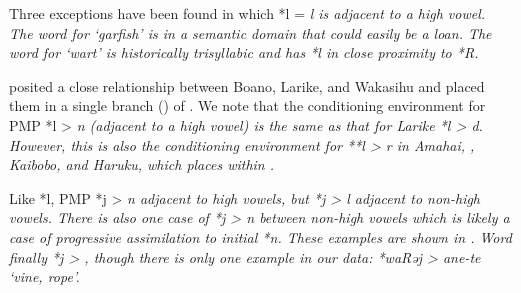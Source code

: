 Three exceptions have been found in which *l = \it{l} is adjacent
to a high vowel.
The word for ‘garfish’ is in a semantic domain that could easily be a loan.
The word for ‘wart’ is historically trisyllabic
and has *l in close proximity to *R.


\citet[69]{Collins1983} posited a close relationship between
Boano, Larike, and Wakasihu and placed them in a single branch () of .
We note that the conditioning environment for PMP *l > \it{n}
(adjacent to a high vowel) is the same as that for Larike *l > \it{d}.
However, this is also the conditioning environment for **l >
\it{r} in Amahai, , Kaibobo, and Haruku, which \citet[100]{Collins1983}
places within .

Like *l, PMP *j > \it{n} adjacent to high vowels,
but *j > \it{l} adjacent to non-high vowels.
There is also one case of *j > \it{n} between non-high vowels
which is likely a case of progressive assimilation to initial *n.
These examples are shown in .
Word finally *j > {\0},
though there is only one example in our data: *waRəj > \it{ane-te}
‘vine, rope’.

